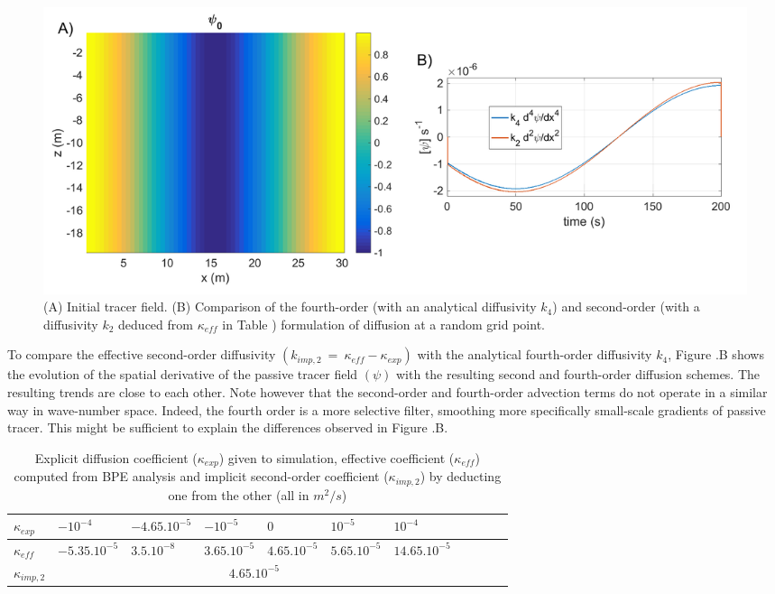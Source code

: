 \begin{figure}[h!]
\centering
\includegraphics[width=1\textwidth]{./CHAP_BPE/AGBPE_numlab5.png}
\caption[Initial field and comparison of coefficient $k_2$ and $k_4$ for configuration $BPE_{imp}$ with RK3-UP3 schemes]{(A) Initial tracer field. (B) Comparison of the fourth-order (with an analytical diffusivity $k_4$) and second-order (with a diffusivity $k_2$ deduced from $\kappa_{eff}$ in Table ) formulation of diffusion at a random grid point.}
\label{fig5numlab}
\end{figure}

To compare the effective second-order diffusivity $(k_{imp,2}\ =\ \kappa_{eff}-\kappa_{exp})$ with the analytical fourth-order diffusivity $k_4$, Figure .B shows the evolution of the spatial derivative of the passive tracer field $(\psi)$ with the resulting second and fourth-order diffusion schemes. The resulting trends are close to each other.
Note however that the second-order and fourth-order advection terms do not operate in a similar way in wave-number space. Indeed, the fourth order is a more selective filter, smoothing more specifically small-scale gradients of passive tracer. This might be sufficient to explain the differences observed in Figure .B.

\begin{table}[h!]
\centering
\begin{tabular}{|l|l|l|l|l|l|l|l|l|l|l|}
\hline
$\kappa_{exp}$ & $-10^{-4}$ &$-4.65.10^{-5}$ & $-10^{-5}$& $0$& $10^{-5}$& $10^{-4}$\\
\hline
$\kappa_{eff}$ & $-5.35.10^{-5}$ &$3.5.10^{-8}$ & $3.65.10^{-5}$& $4.65.10^{-5}$& $5.65.10^{-5}$& $14.65.10^{-5}$\\
\hline
$\kappa_{imp,2}$&\multicolumn{6}{c|}{$4.65.10^{-5}$}\\
\hline
\end{tabular}
\caption{Explicit diffusion coefficient ($\kappa_{exp}$) given to simulation, effective coefficient ($\kappa_{eff}$) computed from BPE analysis and implicit second-order coefficient ($\kappa_{imp,2}$) by deducting one from the other (all in $m^2/s$)}
\label{table_kappa}
\end{table}

